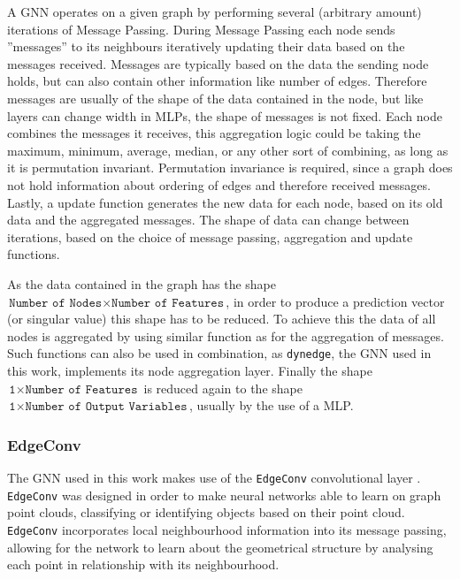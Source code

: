 \documentclass[a4paper,10pt]{scrartcl}
\begin{document}
A GNN operates on a given graph by performing several (arbitrary amount) iterations of Message Passing.
During Message Passing each node sends ''messages'' to its neighbours iteratively updating their data based on the messages received.
Messages are typically based on the data the sending node holds, but can also contain other information like number of edges.
Therefore messages are usually of the shape of the data contained in the node, but like layers can change width in MLPs, the shape of messages is not fixed.
Each node combines the messages it receives, this aggregation logic could be taking the maximum, minimum, average, median, or any other sort of combining, as long as it is permutation invariant.
Permutation invariance is required, since a graph does not hold information about ordering of edges and therefore received messages.
Lastly, a update function generates the new data for each node, based on its old data and the aggregated messages.
The shape of data can change between iterations, based on the choice of message passing, aggregation and update functions.

As the data contained in the graph has the shape $\texttt{Number of Nodes} \times \texttt{Number of Features}$, in order to produce a prediction vector (or singular value) this shape has to be reduced.
To achieve this the data of all nodes is aggregated by using similar function as for the aggregation of messages.
Such functions can also be used in combination, as \texttt{dynedge}, the GNN used in this work, implements its node aggregation layer.
Finally the shape $\texttt{1} \times \texttt{Number of Features}$ is reduced again to the shape $\texttt{1} \times \texttt{Number of Output Variables}$, usually by the use of a MLP.

\subsubsection*{EdgeConv}

The GNN used in this work makes use of the \texttt{EdgeConv} convolutional layer \cite{1801.07829}.
\texttt{EdgeConv} was designed in order to make neural networks able to learn on graph point clouds, classifying or identifying objects based on their point cloud.
\texttt{EdgeConv} incorporates local neighbourhood information into its message passing, allowing for the network to learn about the geometrical structure by analysing each point in relationship with its neighbourhood.
\end{document}
